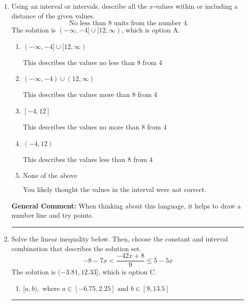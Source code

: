 \documentclass{extbook}[14pt]
\newcommand{\litem}[1]{\item #1

\rule{\textwidth}{0.4pt}}
\begin{document}
\begin{enumerate}
{\begin{enumerate}[label=\Alph*.]
Corresponds to including the endpoints (when they should be excluded).
\item \( (-\infty, a) \cup (b, \infty), \text{ where } a \in [-3.97, -0.67] \text{ and } b \in [-3.75, -0.75] \)

 * Correct option.
\item \( (-\infty, a) \cup (b, \infty), \text{ where } a \in [1.05, 3] \text{ and } b \in [1.5, 3] \)

Corresponds to inverting the inequality and negating the solution.
\item \( (-\infty, a] \cup [b, \infty), \text{ where } a \in [-0.75, 9] \text{ and } b \in [0.75, 3.75] \)

Corresponds to including the endpoints AND negating.
\item \( (-\infty, \infty) \)

Corresponds to the variable canceling, which does not happen in this instance.
\end{enumerate}

\textbf{General Comment:} When multiplying or dividing by a negative, flip the sign.
}
\litem{
Using an interval or intervals, describe all the $x$-values within or including a distance of the given values.
\[ \text{ No less than } 8 \text{ units from the number } 4. \]The solution is \( (-\infty, -4] \cup [12, \infty) \), which is option A.\begin{enumerate}[label=\Alph*.]
\item \( (-\infty, -4] \cup [12, \infty) \)

This describes the values no less than 8 from 4
\item \( (-\infty, -4) \cup (12, \infty) \)

This describes the values more than 8 from 4
\item \( [-4, 12] \)

This describes the values no more than 8 from 4
\item \( (-4, 12) \)

This describes the values less than 8 from 4
\item \( \text{None of the above} \)

You likely thought the values in the interval were not correct.
\end{enumerate}

\textbf{General Comment:} When thinking about this language, it helps to draw a number line and try points.
}
\litem{
Solve the linear inequality below. Then, choose the constant and interval combination that describes the solution set.
\[ -8 - 7 x < \frac{-42 x + 8}{9} \leq 5 - 5 x \]The solution is \( (-3.81, 12.33] \), which is option C.\begin{enumerate}[label=\Alph*.]
\item \( [a, b), \text{ where } a \in [-6.75, 2.25] \text{ and } b \in [9, 13.5] \)


\end{enumerate}}
\end{enumerate}
\end{document}
